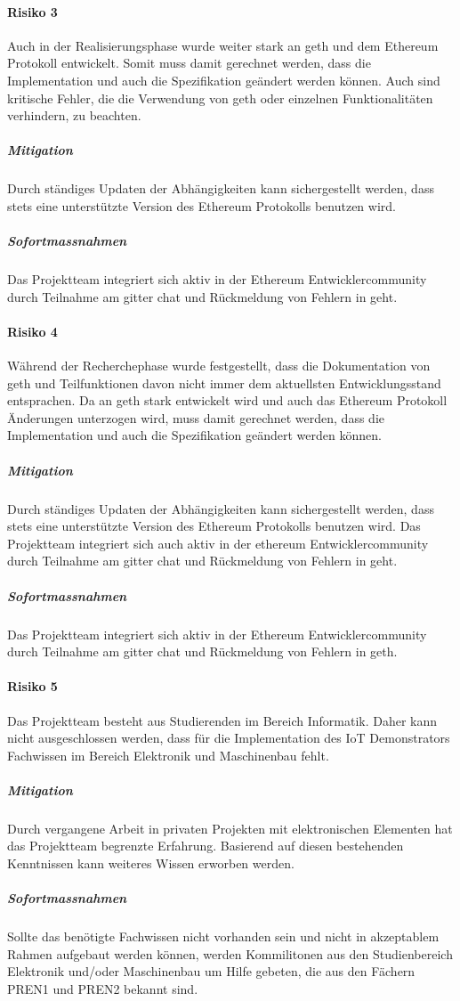 \paragraph{Risiko 3}
Auch in der Realisierungsphase wurde weiter stark an geth und dem Ethereum Protokoll entwickelt. Somit muss damit gerechnet werden, dass die Implementation und auch die Spezifikation geändert werden können. Auch sind kritische Fehler, die die Verwendung von geth oder einzelnen Funktionalitäten verhindern, zu beachten.\cite[EIPs]{github.com/ethereum}
\subparagraph{Mitigation}
Durch ständiges Updaten der Abhängigkeiten kann sichergestellt werden, dass stets eine unterstützte Version des Ethereum Protokolls benutzen wird.
\subparagraph{Sofortmassnahmen}
Das Projektteam integriert sich aktiv in der Ethereum Entwicklercommunity durch Teilnahme am gitter chat und Rückmeldung von Fehlern in geht.

\paragraph{Risiko 4}
Während der Recherchephase wurde festgestellt, dass die Dokumentation von geth und Teilfunktionen davon nicht immer dem aktuellsten Entwicklungsstand entsprachen. Da an geth stark entwickelt wird und auch das Ethereum Protokoll Änderungen unterzogen wird, muss damit gerechnet werden, dass die Implementation und auch die Spezifikation geändert werden können.
\subparagraph{Mitigation}
Durch ständiges Updaten der Abhängigkeiten kann sichergestellt werden, dass stets eine unterstützte Version des Ethereum Protokolls benutzen wird. Das Projektteam integriert sich auch aktiv in der ethereum Entwicklercommunity durch Teilnahme am gitter chat und Rückmeldung von Fehlern in geht.
\subparagraph{Sofortmassnahmen}
Das Projektteam integriert sich aktiv in der Ethereum Entwicklercommunity durch Teilnahme am gitter chat und Rückmeldung von Fehlern in geth.

\paragraph{Risiko 5}
Das Projektteam besteht aus Studierenden im Bereich Informatik. Daher kann nicht ausgeschlossen werden, dass für die Implementation des IoT Demonstrators Fachwissen im Bereich Elektronik und Maschinenbau fehlt.
\subparagraph{Mitigation}
Durch vergangene Arbeit in privaten Projekten mit elektronischen Elementen hat das Projektteam begrenzte Erfahrung. Basierend auf diesen bestehenden Kenntnissen kann weiteres Wissen erworben werden. 
\subparagraph{Sofortmassnahmen}
Sollte das benötigte Fachwissen nicht vorhanden sein und nicht in akzeptablem Rahmen aufgebaut werden können, werden Kommilitonen aus den Studienbereich Elektronik und/oder Maschinenbau um Hilfe gebeten, die aus den Fächern PREN1 und PREN2 bekannt sind.

